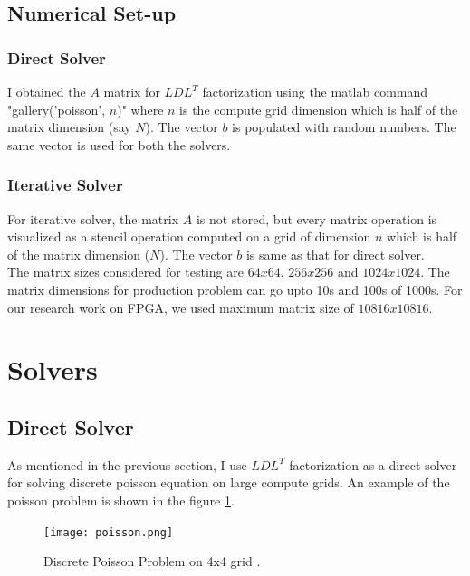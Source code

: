 \documentclass{article}
\begin{document}
\begin{spacing}{1.1}
\subsection{Numerical Set-up}

\subsubsection{Direct Solver}
	I obtained the $A$ matrix for $LDL^T$ factorization using the matlab command "gallery('poisson', $n$)" where $n$ is the compute grid dimension which is half of the matrix dimension (say $N$). The vector $b$ is populated with random numbers. The same vector is used for both the solvers.

\subsubsection{Iterative Solver}
	For iterative solver, the matrix $A$ is not stored, but every matrix operation is visualized as a stencil operation computed on a grid of dimension $n$ which is half of the matrix dimension ($N$). The vector $b$ is same as that for direct solver.
\\
\newline
The matrix sizes considered for testing are $64x64$, $256x256$ and $1024x1024$. The matrix dimensions for production problem can go upto 10s and 100s of 1000s. For our research work on FPGA, we used maximum matrix size of $10816x10816$.


\section{Solvers}

\subsection{Direct Solver}

As mentioned in the previous section, I use $LDL^T$ factorization as a direct solver for solving discrete poisson equation on large compute grids. An example of the poisson problem is shown in the figure \ref{poisson}.

\begin{center}
	\begin{figure}[H]
	\centering
       \texttt{[image: poisson.png]}
        \caption{\label{poisson} Discrete Poisson Problem on 4x4 grid \cite{Berkley1996}.} 
	\end{figure}
\end{center}


\end{spacing}
\end{document}

